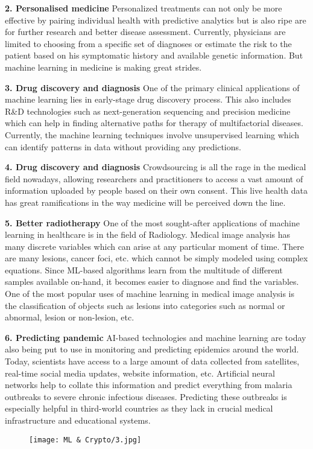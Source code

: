\documentclass{article}
\begin{document}
    \textbf{2. Personalised medicine }Personalized treatments can not only be more effective by pairing individual health with predictive analytics but is also ripe are for further research and better disease assessment. Currently, physicians are limited to choosing from a specific set of diagnoses or estimate the risk to the patient based on his symptomatic history and available genetic information. But machine learning in medicine is making great strides.
    
    \textbf{3. Drug discovery and diagnosis }One of the primary clinical applications of machine learning lies in early-stage drug discovery process. This also includes R&D technologies such as next-generation sequencing and precision medicine which can help in finding alternative paths for therapy of multifactorial diseases. Currently, the machine learning techniques involve unsupervised learning which can identify patterns in data without providing any predictions.
    
    \textbf{4. Drug discovery and diagnosis }Crowdsourcing is all the rage in the medical field nowadays, allowing researchers and practitioners to access a vast amount of information uploaded by people based on their own consent. This live health data has great ramifications in the way medicine will be perceived down the line.
    
    \textbf{5. Better radiotherapy }One of the most sought-after applications of machine learning in healthcare is in the field of Radiology. Medical image analysis has many discrete variables which can arise at any particular moment of time. There are many lesions, cancer foci, etc. which cannot be simply modeled using complex equations. Since ML-based algorithms learn from the multitude of different samples available on-hand, it becomes easier to diagnose and find the variables. One of the most popular uses of machine learning in medical image analysis is the classification of objects such as lesions into categories such as normal or abnormal, lesion or non-lesion, etc.
    
    \textbf{6. Predicting pandemic }AI-based technologies and machine learning are today also being put to use in monitoring and predicting epidemics around the world. Today, scientists have access to a large amount of data collected from satellites, real-time social media updates, website information, etc. Artificial neural networks help to collate this information and predict everything from malaria outbreaks to severe chronic infectious diseases. Predicting these outbreaks is especially helpful in third-world countries as they lack in crucial medical infrastructure and educational systems.\\
    \begin{figure}[h]
        \centering
    	\texttt{[image: ML \& Crypto/3.jpg]}
    \end{figure}
    
\end{document}

